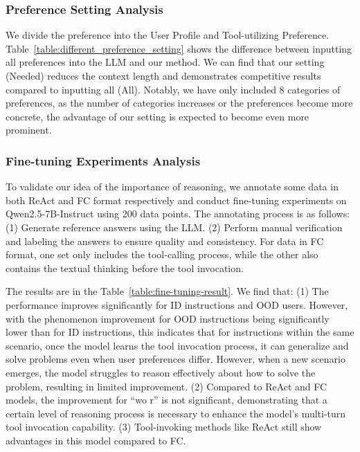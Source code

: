 \documentclass[11pt]{article}
\begin{document}
\subsubsection{Preference Setting Analysis}
We divide the preference into the User Profile and Tool-utilizing Preference. Table~\ref{table:different_preference_setting} shows the difference between inputting all preferences into the LLM and our method. We can find that our setting (Needed) reduces the context length and demonstrates competitive results compared to inputting all (All). Notably, we have only included 8 categories of preferences, as the number of categories increases or the preferences become more concrete, the advantage of our setting is expected to become even more prominent. 


\subsubsection{Fine-tuning Experiments Analysis}
To validate our idea of the importance of reasoning, we annotate some data in both ReAct and FC format respectively and conduct fine-tuning experiments on Qwen2.5-7B-Instruct using 200 data points. The annotating process is as follows: 
(1)	Generate reference answers using the LLM.
(2)	Perform manual verification and labeling the answers to ensure quality and consistency.
For data in FC format, one set only includes the tool-calling process, while the other also contains the textual thinking before the tool invocation.

The results are in the Table~\ref{table:fine-tuning-result}. We find that: (1) The performance improves significantly for ID instructions and OOD users. However, with the phenomenon improvement for OOD instructions being significantly lower than for ID instructions, this indicates that for instructions within the same scenario, once the model learns the tool invocation process, it can generalize and solve problems even when user preferences differ. However, when a new scenario emerges, the model struggles to reason effectively about how to solve the problem, resulting in limited improvement. (2) Compared to ReAct and FC models, the improvement for ``wo r'' is not significant, demonstrating that a certain level of reasoning process is necessary to enhance the model's multi-turn tool invocation capability. (3) Tool-invoking methods like ReAct still show advantages in this model compared to FC.
\end{document}
